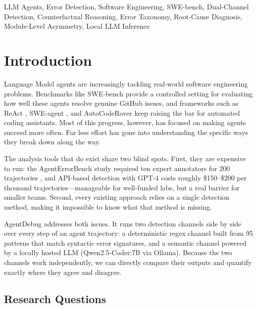\documentclass{ieeeaccess}
\begin{document}
\begin{keywords}
LLM Agents, Error Detection, Software Engineering, SWE-bench, Dual-Channel Detection, Counterfactual Reasoning, Error Taxonomy, Root-Cause Diagnosis, Module-Level Asymmetry, Local LLM Inference
\end{keywords}

\titlepgskip=-15pt

\maketitle


\section{Introduction}
\label{sec:introduction}

 Language Model agents are increasingly tackling real-world software engineering problems. Benchmarks like SWE-bench \cite{b1} provide a controlled setting for evaluating how well these agents resolve genuine GitHub issues, and frameworks such as ReAct \cite{b2}, SWE-agent \cite{b3}, and AutoCodeRover \cite{b4} keep raising the bar for automated coding assistants. Most of this progress, however, has focused on making agents succeed more often. Far less effort has gone into understanding the specific ways they break down along the way.

The analysis tools that do exist share two blind spots. First, they are expensive to run: the AgentErrorBench study required ten expert annotators for 200 trajectories \cite{b5}, and API-based detection with GPT-4 costs roughly \$150--\$200 per thousand trajectories---manageable for well-funded labs, but a real barrier for smaller teams. Second, every existing approach relies on a single detection method, making it impossible to know what that method is missing.

AgentDebug addresses both issues. It runs two detection channels side by side over every step of an agent trajectory: a deterministic regex channel built from 95 patterns that match syntactic error signatures, and a semantic channel powered by a locally hosted LLM (Qwen2.5-Coder:7B via Ollama). Because the two channels work independently, we can directly compare their outputs and quantify exactly where they agree and disagree.

\subsection{Research Questions}
\end{document}
